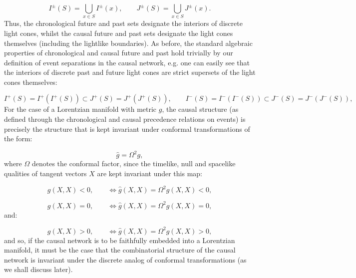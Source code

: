 \documentclass{article}
\begin{document}
\begin{equation}
I^{\pm} \left( S \right) = \bigcup_{x \in S} I^{\pm} \left( x \right), \qquad J^{\pm} \left( S \right) = \bigcup_{x \in S} J^{\pm} \left( x \right).
\end{equation}
Thus, the chronological future and past sets designate the interiors of discrete light cones, whilst the causal future and past sets designate the light cones themselves (including the lightlike boundaries). As before, the standard algebraic properties of chronological and causal future and past hold trivially by our definition of event separations in the causal network, e.g. one can easily see that the interiors of discrete past and future light cones are strict supersets of the light cones themselves:

\begin{equation}
I^{+} \left( S \right) = I^{+} \left( I^{+} \left( S \right) \right) \subset J^{+} \left( S \right) = J^{+} \left( J^{+} \left( S \right) \right), \qquad I^{-} \left( S \right) = I^{-} \left( I^{-} \left( S \right) \right) \subset J^{-} \left( S \right) = J^{-} \left( J^{-} \left( S \right) \right),
\end{equation}
For the case of a Lorentzian manifold with metric $g$, the causal structure (as defined through the chronological and causal precedence relations on events) is precisely the structure that is kept invariant under conformal transformations of the form:

\begin{equation}
\hat{g} = \Omega^2 g,
\end{equation}
where ${\Omega}$ denotes the conformal factor, since the timelike, null and spacelike qualities of tangent vectors $X$ are kept invariant under this map:

\begin{equation}
g \left( X, X \right) < 0, \qquad \iff \hat{g} \left( X, X \right) = \Omega^2 g \left( X, X \right) < 0,
\end{equation}

\begin{equation}
g \left( X, X \right) = 0, \qquad \iff \hat{g} \left( X, X \right) = \Omega^2 g \left( X, X \right) = 0,
\end{equation}
and:

\begin{equation}
g \left( X, X \right) > 0, \qquad \iff \hat{g} \left( X, X \right) = \Omega^2 g \left( X, X \right) > 0,
\end{equation}
and so, if the causal network is to be faithfully embedded into a Lorentzian manifold, it must be the case that the combinatorial structure of the causal network is invariant under the discrete analog of conformal transformations (as we shall discuss later).
\end{document}
